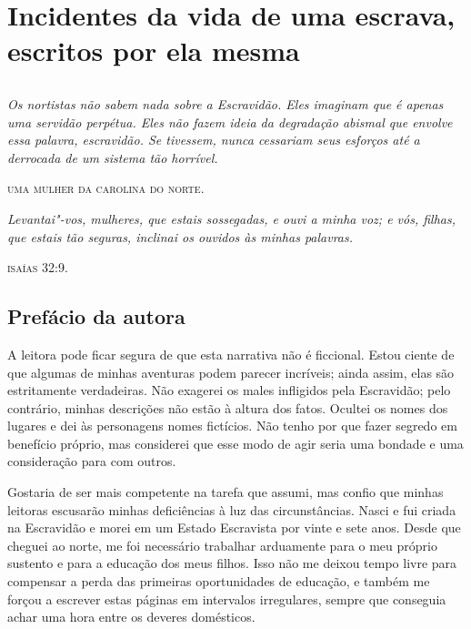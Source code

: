 \part*{Incidentes da vida de uma escrava, escritos por ela mesma}

\chapter*{}

\thispagestyle{empty}
\vspace*{\fill}

\epigraph{\emph{Os nortistas não sabem nada sobre a
Escravidão. Eles imaginam que é apenas uma servidão perpétua. Eles não
fazem ideia da degradação abismal que envolve essa palavra,
escravidão. Se tivessem, nunca cessariam seus esforços até a derrocada
de um sistema tão horrível.}}{\textsc{uma mulher da carolina do norte}.}

\epigraph{\emph{Levantai"-vos, mulheres, que estais
sossegadas, e ouvi a minha voz; e vós, filhas, que estais tão seguras,
inclinai os ouvidos às minhas palavras.}}{\textsc{isaías 32:9}.}

\chapter*{Prefácio da autora}

A leitora pode ficar segura de que esta
narrativa não é ficcional. Estou ciente de que algumas de minhas
aventuras podem parecer incríveis; ainda assim, elas são estritamente
verdadeiras. Não exagerei os males infligidos pela Escravidão; pelo
contrário, minhas descrições não estão à altura dos fatos. Ocultei os
nomes dos lugares e dei às personagens nomes fictícios. Não tenho por
que fazer segredo em benefício próprio, mas considerei que esse modo de
agir seria uma bondade e uma consideração para com outros.

Gostaria de ser mais competente na
tarefa que assumi, mas confio que minhas leitoras escusarão minhas
deficiências à luz das circunstâncias. Nasci e fui criada na Escravidão
e morei em um Estado Escravista por vinte e sete anos. Desde que cheguei
ao norte, me foi necessário trabalhar arduamente para o meu próprio
sustento e para a educação dos meus filhos. Isso não me deixou tempo
livre para compensar a perda das primeiras oportunidades de educação, e
também me forçou a escrever estas páginas em intervalos irregulares,
sempre que conseguia achar uma hora entre os deveres domésticos.

